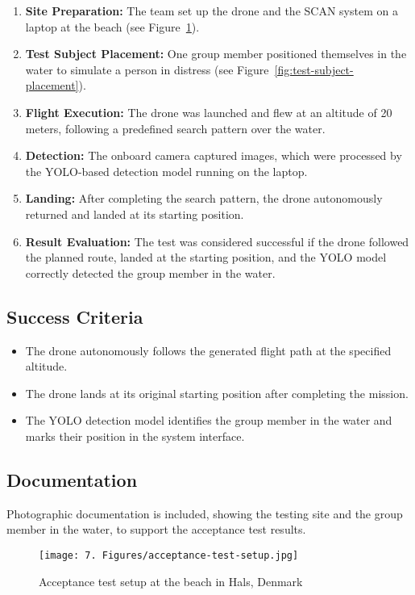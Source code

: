 \begin{enumerate}
    \item \textbf{Site Preparation:} The team set up the drone and the SCAN system on a laptop at the beach (see Figure~\ref{fig:acceptance-test-setup}).
    \item \textbf{Test Subject Placement:} One group member positioned themselves in the water to simulate a person in distress (see Figure~\ref{fig:test-subject-placement}).
    \item \textbf{Flight Execution:} The drone was launched and flew at an altitude of 20 meters, following a predefined search pattern over the water.
    \item \textbf{Detection:} The onboard camera captured images, which were processed by the YOLO-based detection model running on the laptop.
    \item \textbf{Landing:} After completing the search pattern, the drone autonomously returned and landed at its starting position.
    \item \textbf{Result Evaluation:} The test was considered successful if the drone followed the planned route, landed at the starting position, and the YOLO model correctly detected the group member in the water.
\end{enumerate}

\subsection{Success Criteria}

\begin{itemize}
    \item The drone autonomously follows the generated flight path at the specified altitude.
    \item The drone lands at its original starting position after completing the mission.
    \item The YOLO detection model identifies the group member in the water and marks their position in the system interface.
\end{itemize}

\subsection{Documentation}

Photographic documentation is included, showing the testing site and the group member in the water, to support the acceptance test results.

\begin{figure}[H]
    \centering
    \texttt{[image: 7. Figures/acceptance-test-setup.jpg]}
    \caption{Acceptance test setup at the beach in Hals, Denmark}
    \label{fig:acceptance-test-setup}
\end{figure}

